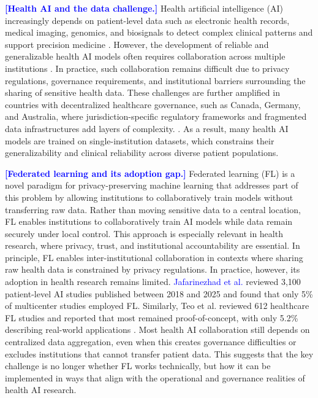 \documentclass[preprint,5p, 10pt, times]{elsarticle}
\begin{document}
\textcolor{blue}{\textbf{[Health AI and the data challenge.]}}
Health artificial intelligence (AI) increasingly depends on patient-level data such as electronic health records, medical imaging, genomics, and biosignals to detect complex clinical patterns and support precision medicine \cite{moor2023foundation, acosta2022multimodal,tu2024towards}. 
However, the development of reliable and generalizable health AI models often requires collaboration across multiple institutions \cite{tayebi2023enhancing,rockenschaub2024impact,li2023model}. 
In practice, such collaboration remains difficult due to privacy regulations, governance requirements, and institutional barriers surrounding the sharing of sensitive health data. 
These challenges are further amplified in countries with decentralized healthcare governance, such as Canada, Germany, and Australia, where jurisdiction-specific regulatory frameworks and fragmented data infrastructures add layers of complexity.
\cite{alami2024understanding,hassan2024barriers}.
As a result, many health AI models are trained on single-institution datasets, which constrains their generalizability and clinical reliability across diverse patient populations\cite{suleman2025assessing, arun2025systematic,pandian2025generalizing,naderian2025systematic}.

\textcolor{blue}{\textbf{[Federated learning and its adoption gap.]}}
Federated learning (FL) is a novel paradigm for privacy-preserving machine learning that addresses part of this problem by allowing institutions to collaboratively train models without transferring raw data.
Rather than moving sensitive data to a central location, FL enables institutions to collaboratively train AI models while data remain securely under local control\cite{mcmahan2017communication,ur2021federated}. 
This approach is especially relevant in health research, where privacy, trust, and institutional accountability are essential\cite{teo2024federated,guan2024federated}. 
In principle, FL enables inter-institutional collaboration in contexts where sharing raw health data is constrained by privacy regulations.
In practice, however, its adoption in health research remains limited.
\textcolor{blue}{Jafarinezhad et al.} reviewed 3,100 patient-level AI studies published between 2018 and 2025 and found that only 5\% of multicenter studies employed FL. Similarly, Teo et al. reviewed 612 healthcare FL studies and reported that most remained proof-of-concept, with only 5.2\% describing real-world applications \cite{teo2024federated}.
Most health AI collaboration still depends on centralized data aggregation, even when this creates governance difficulties or excludes institutions that cannot transfer patient data. This suggests that the key challenge is no longer whether FL works technically, but how it can be implemented in ways that align with the operational and governance realities of health AI research.
\end{document}
